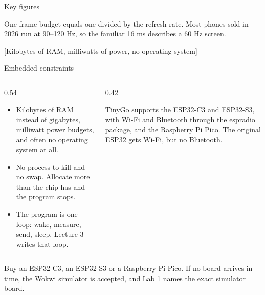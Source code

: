 \documentclass[10pt,aspectratio=169,t]{beamer}
\begin{document}
\begin{frame}[eyebrow=Device spectrum]{Key figures}
  \vskip 2mm
  \begin{grid}[3]
  \end{grid}
  \begin{takeaway}{One frame budget equals one divided by the refresh rate.}
    Most phones sold in 2026 run at 90–120 Hz, so the familiar 16 ms describes a 60 Hz screen.
  \end{takeaway}
\end{frame}

[Kilobytes of RAM, milliwatts of power, no operating system]

\begin{frame}[embedded,eyebrow=Embedded]{Embedded constraints}
  \vskip 2mm
  \begin{columns}[T]
    \begin{column}{0.54\textwidth}
      \begin{itemize}
        \item Kilobytes of RAM instead of gigabytes, milliwatt power budgets, and often no operating system at all.
        \item No process to kill and no swap. Allocate more than the chip has and the program stops.
        \item The program is one loop: wake, measure, send, sleep. Lecture 3 writes that loop.
      \end{itemize}
    \end{column}
    \begin{column}{0.42\textwidth}
      \begin{hint}
        TinyGo supports the ESP32-C3 and ESP32-S3, with Wi-Fi and Bluetooth through the espradio package, and the Raspberry Pi Pico. The original ESP32 gets Wi-Fi, but no Bluetooth.
      \end{hint}
    \end{column}
  \end{columns}
  \begin{takeaway}{Buy an ESP32-C3, an ESP32-S3 or a Raspberry Pi Pico.}
    If no board arrives in time, the Wokwi simulator is accepted, and Lab 1 names the exact simulator board.
  \end{takeaway}
\end{frame}
\end{document}
